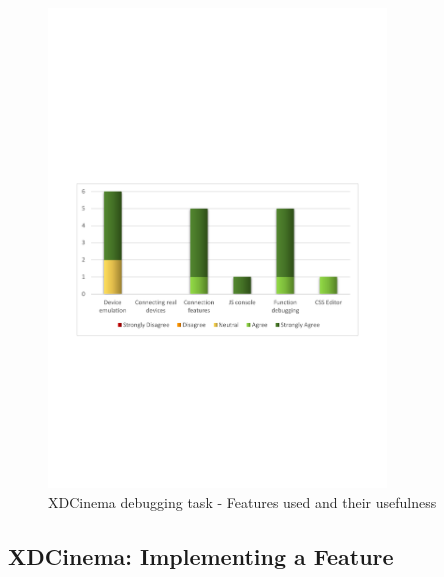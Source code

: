 \begin{figure}[H]
  \centering
    \includegraphics[width=0.8\textwidth]{images/charts/xdc_bug_features_used.pdf}
	\caption[xdc-bug: Features used]{XDCinema debugging task - Features used and their usefulness}
	\label{fig:xdc_bug_features_used}
\end{figure}

\subsection{XDCinema: Implementing a Feature}

